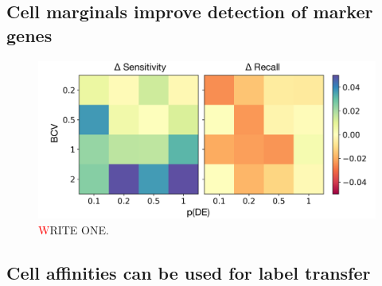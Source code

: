 \documentclass[10pt]{article}
\begin{document}
\subsection*{Cell marginals improve detection of marker genes}

\begin{figure}[H]
\centering
\includegraphics[keepaspectratio,width=\textwidth,width=0.50\textheight]{Figure_DE.png}
\caption[]{\textcolor{red} WRITE ONE. }\label{Figure_DE}
\end{figure}


\subsection*{Cell affinities can be used for label transfer}
\end{document}

